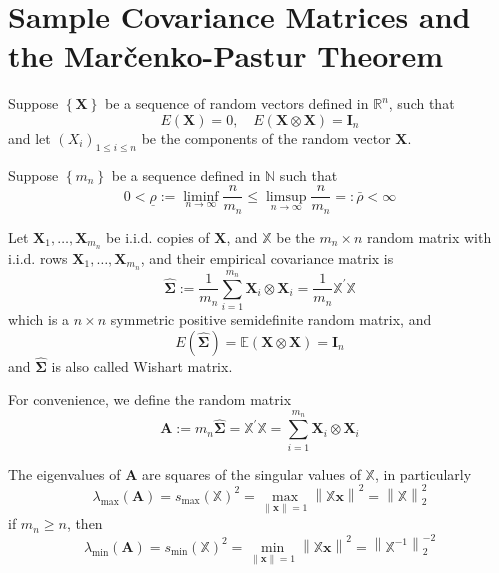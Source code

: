 \chapter{Sample Covariance Matrices and the Marčenko-Pastur Theorem}

Suppose $\left\{\mathbf{X}\right\}$ be a sequence of random vectors defined in $\mathbb{R}^{n}$, such that
\begin{equation*}
    E\left(\mathbf{X}\right)=0,\quad E\left(\mathbf{X}\otimes\mathbf{X}\right)=\mathbf{I}_{n}
\end{equation*}
and let $\left(X_{i}\right)_{1\leq i\leq n}$ be the components of the random vector $\mathbf{X}$.

Suppose $\left\{m_{n}\right\}$ be a sequence defined in $\mathbb{N}$ such that
\begin{equation*}
    0<\underline{\rho}:=\liminf_{n\rightarrow\infty}\frac{n}{m_{n}}\leq\limsup_{n\rightarrow\infty}\frac{n}{m_{n}}=:\bar{\rho}<\infty
\end{equation*}

Let $\mathbf{X}_{1},\ldots,\mathbf{X}_{m_{n}}$ be i.i.d. copies of $\mathbf{X}$, and $\mathbb{X}$ be the $m_{n}\times n$ random matrix with i.i.d. rows $\mathbf{X}_{1},\ldots,\mathbf{X}_{m_{n}}$, and their empirical covariance matrix is
\begin{equation*}
    \widehat{\boldsymbol{\Sigma}}:=\frac{1}{m_{n}}\sum_{i=1}^{m_{n}}\mathbf{X}_{i}\otimes \mathbf{X}_{i}=\frac{1}{m_{n}}\mathbb{X}^{\prime}\mathbb{X}
\end{equation*}
which is a $n\times n$ symmetric positive semidefinite random matrix, and
\begin{equation*}
    E\left(\widehat{\boldsymbol{\Sigma}}\right)=\mathbb{E}\left(\mathbf{X}\otimes\mathbf{X}\right)=\mathbf{I}_{n}
\end{equation*}
and $\widehat{\boldsymbol{\Sigma}}$ is also called Wishart matrix.

For convenience, we define the random matrix
\begin{equation*}
    \mathbf{A}:=m_{n}\widehat{\boldsymbol{\Sigma}}=\mathbb{X}^{\prime}\mathbb{X}=\sum_{i=1}^{m_{n}}\mathbf{X}_{i}\otimes\mathbf{X}_{i}
\end{equation*}

\begin{note}
    The eigenvalues of $\mathbf{A}$ are squares of the singular values of $\mathbb{X}$, in particularly
    \begin{equation*}
        \lambda_{\max}\left(\mathbf{A}\right)=s_{\max}\left(\mathbb{X}\right)^{2}=\max_{\|\mathbf{x}\|=1}\left\|\mathbb{X}\mathbf{x}\right\|^{2}=\left\|\mathbb{X}\right\|_{2}^{2}
    \end{equation*}
    if $m_{n}\geq n$, then
    \begin{equation*}
        \lambda_{\min}\left(\mathbf{A}\right)=s_{\min}\left(\mathbb{X}\right)^{2}=\min_{\|\mathbf{x}\|=1}\left\|\mathbb{X}\mathbf{x}\right\|^{2}=\left\|\mathbb{X}^{-1}\right\|_{2}^{-2}
    \end{equation*}
\end{note}

